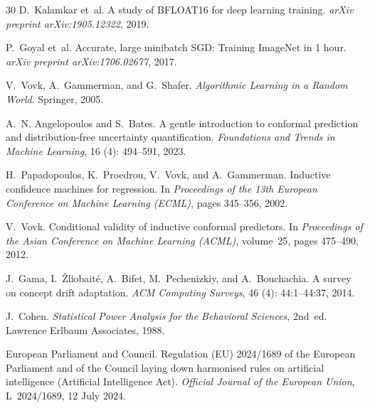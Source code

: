 \documentclass[12pt,a4paper]{article}
\begin{document}
\begin{thebibliography}{30}
D.~Kalamkar et~al.
\newblock A study of {BFLOAT16} for deep learning training.
\newblock \emph{arXiv preprint arXiv:1905.12322}, 2019.

P.~Goyal et~al.
\newblock Accurate, large minibatch {SGD}: Training {ImageNet} in 1 hour.
\newblock \emph{arXiv preprint arXiv:1706.02677}, 2017.

V.~Vovk, A.~Gammerman, and G.~Shafer.
\newblock \emph{Algorithmic Learning in a Random World}.
\newblock Springer, 2005.

A.~N. Angelopoulos and S.~Bates.
\newblock A gentle introduction to conformal prediction and
  distribution-free uncertainty quantification.
\newblock \emph{Foundations and Trends in Machine Learning}, 16
  (4): 494--591, 2023.

H.~Papadopoulos, K.~Proedrou, V.~Vovk, and A.~Gammerman.
\newblock Inductive confidence machines for regression.
\newblock In \emph{Proceedings of the 13th European Conference on Machine
  Learning (ECML)}, pages 345--356, 2002.

V.~Vovk.
\newblock Conditional validity of inductive conformal predictors.
\newblock In \emph{Proceedings of the Asian Conference on Machine Learning
  (ACML)}, volume~25, pages 475--490, 2012.

J.~Gama, I.~\v{Z}liobait\'{e}, A.~Bifet, M.~Pechenizkiy, and A.~Bouchachia.
\newblock A survey on concept drift adaptation.
\newblock \emph{ACM Computing Surveys}, 46 (4): 44:1--44:37,
  2014.

J.~Cohen.
\newblock \emph{Statistical Power Analysis for the Behavioral Sciences},
  2nd~ed.
\newblock Lawrence Erlbaum Associates, 1988.

{European Parliament and Council}.
\newblock Regulation ({EU}) 2024/1689 of the {European Parliament} and of the
  {Council} laying down harmonised rules on artificial intelligence (Artificial
  {Intelligence} {Act}).
\newblock \emph{Official Journal of the European Union}, L~2024/1689, 12 July
  2024.

\end{thebibliography}
\end{document}
